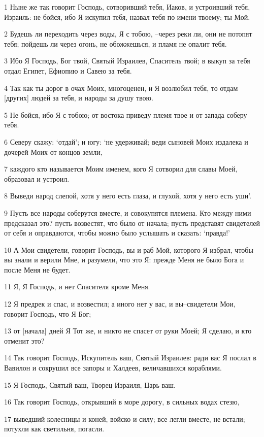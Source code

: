 \par 1 Ныне же так говорит Господь, сотворивший тебя, Иаков, и устроивший тебя, Израиль: не бойся, ибо Я искупил тебя, назвал тебя по имени твоему; ты Мой.
\par 2 Будешь ли переходить через воды, Я с тобою, --через реки ли, они не потопят тебя; пойдешь ли через огонь, не обожжешься, и пламя не опалит тебя.
\par 3 Ибо Я Господь, Бог твой, Святый Израилев, Спаситель твой; в выкуп за тебя отдал Египет, Ефиопию и Савею за тебя.
\par 4 Так как ты дорог в очах Моих, многоценен, и Я возлюбил тебя, то отдам [других] людей за тебя, и народы за душу твою.
\par 5 Не бойся, ибо Я с тобою; от востока приведу племя твое и от запада соберу тебя.
\par 6 Северу скажу: `отдай'; и югу: `не удерживай; веди сыновей Моих издалека и дочерей Моих от концов земли,
\par 7 каждого кто называется Моим именем, кого Я сотворил для славы Моей, образовал и устроил.
\par 8 Выведи народ слепой, хотя у него есть глаза, и глухой, хотя у него есть уши'.
\par 9 Пусть все народы соберутся вместе, и совокупятся племена. Кто между ними предсказал это? пусть возвестят, что было от начала; пусть представят свидетелей от себя и оправдаются, чтобы можно было услышать и сказать: `правда!'
\par 10 А Мои свидетели, говорит Господь, вы и раб Мой, которого Я избрал, чтобы вы знали и верили Мне, и разумели, что это Я: прежде Меня не было Бога и после Меня не будет.
\par 11 Я, Я Господь, и нет Спасителя кроме Меня.
\par 12 Я предрек и спас, и возвестил; а иного нет у вас, и вы--свидетели Мои, говорит Господь, что Я Бог;
\par 13 от [начала] дней Я Тот же, и никто не спасет от руки Моей; Я сделаю, и кто отменит это?
\par 14 Так говорит Господь, Искупитель ваш, Святый Израилев: ради вас Я послал в Вавилон и сокрушил все запоры и Халдеев, величавшихся кораблями.
\par 15 Я Господь, Святый ваш, Творец Израиля, Царь ваш.
\par 16 Так говорит Господь, открывший в море дорогу, в сильных водах стезю,
\par 17 выведший колесницы и коней, войско и силу; все легли вместе, не встали; потухли как светильня, погасли.

